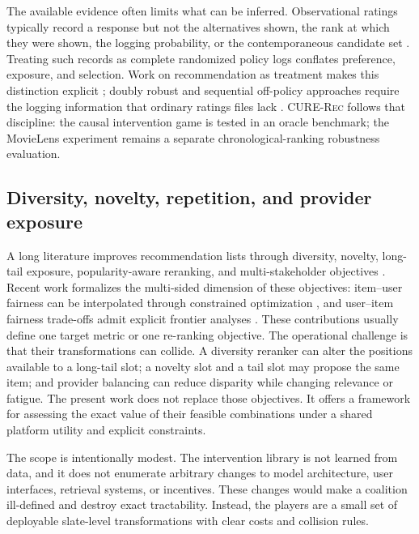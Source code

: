 \documentclass[pdflatex,sn-mathphys-num]{sn-jnl}
\theoremstyle{thmstyleone}
\theoremstyle{thmstyletwo}
\theoremstyle{thmstylethree}
\newcommand{\CURE}{\textsc{CURE-Rec}}
\begin{document}
The available evidence often limits what can be inferred. Observational ratings typically record a response but not the alternatives shown, the rank at which they were shown, the logging probability, or the contemporaneous candidate set \cite{pearl2009causality,athey2017state}. Treating such records as complete randomized policy logs conflates preference, exposure, and selection. Work on recommendation as treatment makes this distinction explicit \cite{schnabel2016recommendations}; doubly robust and sequential off-policy approaches require the logging information that ordinary ratings files lack \cite{dudik2014doubly,kallus2020efficient}. \CURE{} follows that discipline: the causal intervention game is tested in an oracle benchmark; the MovieLens experiment remains a separate chronological-ranking robustness evaluation.

\subsection{Diversity, novelty, repetition, and provider exposure}

A long literature improves recommendation lists through diversity, novelty, long-tail exposure, popularity-aware reranking, and multi-stakeholder objectives \cite{ziegler2005improving,vargas2011rank,castells2015novelty,abdollahpouri2019popularity,burke2018multistakeholder,ekstrand2022fairness}. Recent work formalizes the multi-sided dimension of these objectives: item--user fairness can be interpolated through constrained optimization \cite{chen2024interpolating}, and user--item fairness trade-offs admit explicit frontier analyses \cite{greenwood2024fairness}. These contributions usually define one target metric or one re-ranking objective. The operational challenge is that their transformations can collide. A diversity reranker can alter the positions available to a long-tail slot; a novelty slot and a tail slot may propose the same item; and provider balancing can reduce disparity while changing relevance or fatigue. The present work does not replace those objectives. It offers a framework for assessing the exact value of their feasible combinations under a shared platform utility and explicit constraints.

The scope is intentionally modest. The intervention library is not learned from data, and it does not enumerate arbitrary changes to model architecture, user interfaces, retrieval systems, or incentives. These changes would make a coalition ill-defined and destroy exact tractability. Instead, the players are a small set of deployable slate-level transformations with clear costs and collision rules.
\end{document}
